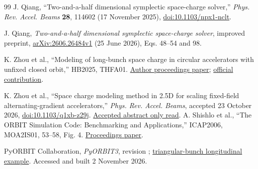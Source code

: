 \begin{thebibliography}{99}
J. Qiang, ``Two-and-a-half dimensional symplectic space-charge solver,''
\emph{Phys. Rev. Accel. Beams} \textbf{28}, 114602 (17 November 2025),
\href{https://doi.org/10.1103/npx1-nclt}{doi:10.1103/npx1-nclt}.

J. Qiang, \emph{Two-and-a-half dimensional symplectic space-charge solver},
improved preprint, \href{https://arxiv.org/abs/2606.26484v1}{arXiv:2606.26484v1}
(25 June 2026), Eqs. 48--54 and 98.

K. Zhou et al., ``Modeling of long-bunch space charge in circular accelerators
with unfixed closed orbit,'' HB2025, THFA01.
\href{https://meow.elettra.eu/83/pdf/THFA01.pdf}{Author proceedings paper};
\href{https://indico.jacow.org/event/83/contributions/11624/}{official contribution}.

K. Zhou et al., ``Space charge modeling method in 2.5D for scaling fixed-field
alternating-gradient accelerators,'' \emph{Phys. Rev. Accel. Beams}, accepted
23 October 2026, \href{https://doi.org/10.1103/q1xb-z29j}{doi:10.1103/q1xb-z29j}.
\href{https://journals.aps.org/prab/accepted/10.1103/q1xb-z29j}{Accepted abstract only read}.
A. Shishlo et al., ``The ORBIT Simulation Code: Benchmarking and Applications,''
ICAP2006, MOA2IS01, 53--58, Fig. 4.
\href{https://accelconf.web.cern.ch/icap06/papers/MOA2IS01.pdf}{Proceedings paper}.

PyORBIT Collaboration, \emph{PyORBIT3}, revision
;
\href{https://github.com/PyORBIT-Collaboration/PyORBIT3/blob/28df66018aebe4e2b780b9747f4a2d7b8430a5c0/examples/SpaceCharge/scSliceBySlice2D/sc_Slice2D_driftLatt_longitudinal_test.py}{triangular-bunch longitudinal example}.
Accessed and built 2 November 2026.
\end{thebibliography}
